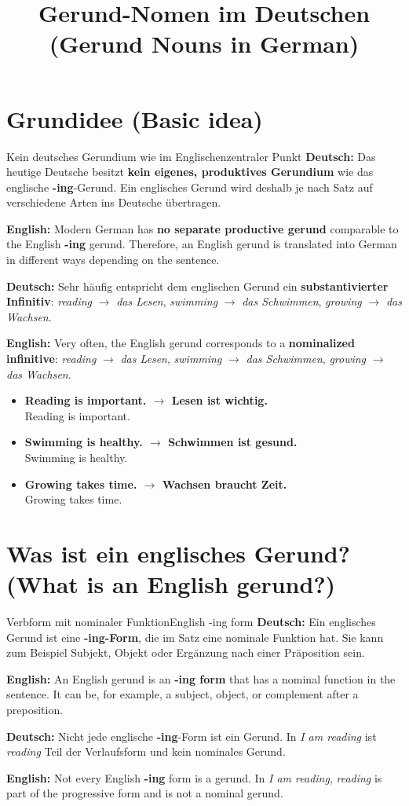 \documentclass[a4paper,11pt]{article}
\title{Gerund-Nomen im Deutschen\\\large\textnormal{(Gerund Nouns in German)}}
\date{}
\newcommand{\GermanText}[1]{\textbf{Deutsch: }#1\par}
\newcommand{\EnglishText}[1]{{\small\color{SoftGray}\textbf{English: }#1\par}}
\newcommand{\ExampleItem}[2]{\item \textbf{#1}\\{\small\color{SoftGray}#2}}
\begin{document}
\maketitle
\tableofcontents
\newpage

\section{Grundidee \textnormal{(Basic idea)}}
\begin{grammarentry}{Kein deutsches Gerundium wie im Englischen}{zentraler Punkt}
\GermanText{Das heutige Deutsche besitzt \textbf{kein eigenes, produktives Gerundium} wie das englische \textbf{-ing}-Gerund. Ein englisches Gerund wird deshalb je nach Satz auf verschiedene Arten ins Deutsche übertragen.}
\EnglishText{Modern German has \textbf{no separate productive gerund} comparable to the English \textbf{-ing} gerund. Therefore, an English gerund is translated into German in different ways depending on the sentence.}

\GermanText{Sehr häufig entspricht dem englischen Gerund ein \textbf{substantivierter Infinitiv}: \textit{reading} $\rightarrow$ \textit{das Lesen}, \textit{swimming} $\rightarrow$ \textit{das Schwimmen}, \textit{growing} $\rightarrow$ \textit{das Wachsen}.}
\EnglishText{Very often, the English gerund corresponds to a \textbf{nominalized infinitive}: \textit{reading} $\rightarrow$ \textit{das Lesen}, \textit{swimming} $\rightarrow$ \textit{das Schwimmen}, \textit{growing} $\rightarrow$ \textit{das Wachsen}.}
\end{grammarentry}

\begin{exbox}
\begin{itemize}
\ExampleItem{Reading is important. $\rightarrow$ Lesen ist wichtig.}{Reading is important.}
\ExampleItem{Swimming is healthy. $\rightarrow$ Schwimmen ist gesund.}{Swimming is healthy.}
\ExampleItem{Growing takes time. $\rightarrow$ Wachsen braucht Zeit.}{Growing takes time.}
\end{itemize}
\end{exbox}

\section{Was ist ein englisches Gerund? \textnormal{(What is an English gerund?)}}
\begin{grammarentry}{Verbform mit nominaler Funktion}{English -ing form}
\GermanText{Ein englisches Gerund ist eine \textbf{-ing-Form}, die im Satz eine nominale Funktion hat. Sie kann zum Beispiel Subjekt, Objekt oder Ergänzung nach einer Präposition sein.}
\EnglishText{An English gerund is an \textbf{-ing form} that has a nominal function in the sentence. It can be, for example, a subject, object, or complement after a preposition.}

\GermanText{Nicht jede englische \textbf{-ing}-Form ist ein Gerund. In \textit{I am reading} ist \textit{reading} Teil der Verlaufsform und kein nominales Gerund.}
\EnglishText{Not every English \textbf{-ing} form is a gerund. In \textit{I am reading}, \textit{reading} is part of the progressive form and is not a nominal gerund.}
\end{grammarentry}
\end{document}
